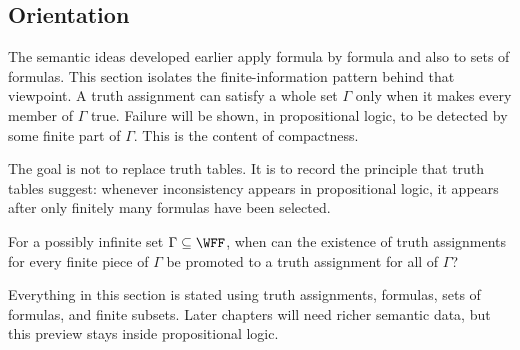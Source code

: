 \subsection*{Orientation}

\begin{remark*}[Orientation]
The semantic ideas developed earlier apply formula by formula and also to
sets of formulas. This section isolates the finite-information pattern behind
that viewpoint. A truth assignment can satisfy a whole set \(\Gamma\) only when
it makes every member of \(\Gamma\) true. Failure will be shown, in
propositional logic, to be detected by some finite part of \(\Gamma\). This is
the content of compactness.

The goal is not to replace truth tables. It is to record the principle that
truth tables suggest: whenever inconsistency appears in propositional logic, it
appears after only finitely many formulas have been selected.
\end{remark*}

\begin{remark*}
For a possibly infinite set \(\Gamma\subseteq\WFF\), when can the existence of
truth assignments for every finite piece of \(\Gamma\) be promoted to a truth
assignment for all of \(\Gamma\)?
\end{remark*}

\begin{remark*}
Everything in this section is stated using truth assignments, formulas, sets of
formulas, and finite subsets. Later chapters will need richer semantic data,
but this preview stays inside propositional logic.
\end{remark*}
